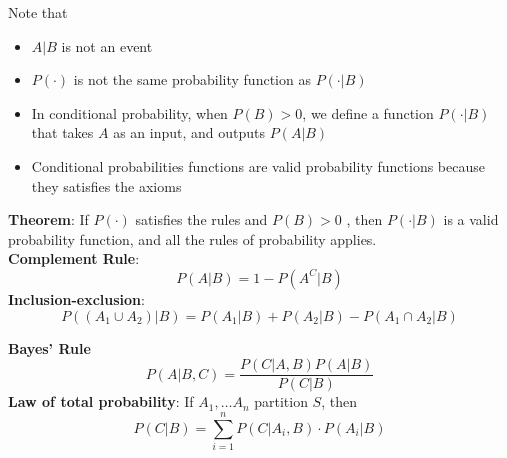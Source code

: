 Note that
\begin{itemize}
   \item $A|B$ is not an event 
   \item $P(\cdot)$ is not the same probability function as  $P(\cdot |B)$ 
   \item In conditional probability, when $P(B) >  0$, we define a function $P(\cdot |B)$ that takes $A$ as an input, and outputs $P(A|B)$
   \item Conditional probabilities functions are valid probability functions because they satisfies the axioms
\end{itemize}

\begin{framed}
   \textbf{Theorem}: If $P(\cdot)$ satisfies the rules and $P(B) >0$
  , then $P(\cdot |B)$ is a valid probability function, and all the rules of probability applies. \\

  \textbf{Complement Rule}: 
  \[
    P(A|B) = 1- P(A^C |B)
  \] 
  \textbf{Inclusion-exclusion}:
  \[
    P \left( \left( A_1 \cup A_2 \right) |B \right)  = P(A_1 |B) + P(A_2 | B) - P(A_1 \cap A_2 |B)
  \] 

  \textbf{Bayes' Rule}
  \[
    P(A| B, C) = \frac{P(C | A, B) P(A | B)}{P(C | B)}
  \] 
  \textbf{Law of total probability}: If $A_1, \hdots A_n$ partition $S$, then
  \[
     P(C | B) = \sum_{i = 1}^{n}P(C | A_i, B) \cdot P(A_i |B)
  \] 
\end{framed}


